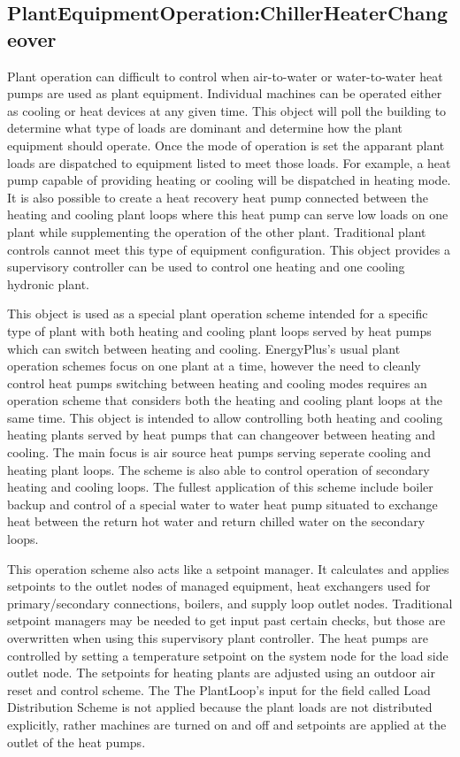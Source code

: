 \subsection{PlantEquipmentOperation:ChillerHeaterChangeover}\label{plantequipmentoperationchillerheaterchangeover}

Plant operation can difficult to control when air-to-water or water-to-water heat pumps are used as plant equipment.  Individual machines can be operated either as cooling or heat devices at any given time.  This object will poll the building to determine what type of loads are dominant and determine how the plant equipment should operate. Once the mode of operation is set the apparant plant loads are dispatched to equipment listed to meet those loads. For example, a heat pump capable of providing heating or cooling will be dispatched in heating mode. It is also possible to create a heat recovery heat pump connected between the heating and cooling plant loops where this heat pump can serve low loads on one plant while supplementing the operation of the other plant. Traditional plant controls cannot meet this type of equipment configuration. This object provides a supervisory controller can be used to control one heating and one cooling hydronic plant.

This object is used as a special plant operation scheme intended for a specific type of plant with both heating and cooling plant loops served by heat pumps which can switch between heating and cooling.  EnergyPlus's usual plant operation schemes focus on one plant at a time, however the need to cleanly control heat pumps switching between heating and cooling modes requires an operation scheme that considers both the heating and cooling plant loops at the same time.  This object is intended to allow controlling both heating and cooling heating plants served by heat pumps that can changeover between heating and cooling.  The main focus is air source heat pumps serving seperate cooling and heating plant loops.  The scheme is also able to control operation of secondary heating and cooling loops.  The fullest application of this scheme include boiler backup and control of a special water to water heat pump situated to exchange heat between the return hot water and return chilled water on the secondary loops.  

This operation scheme also acts like a setpoint manager.  It calculates and applies setpoints to the outlet nodes of managed equipment, heat exchangers used for primary/secondary connections, boilers, and supply loop outlet nodes.  Traditional setpoint managers may be needed to get input past certain checks, but those are overwritten when using this supervisory plant controller.  The heat pumps are controlled by setting a temperature setpoint on the system node for the load side outlet node.  The setpoints for heating plants are adjusted using an outdoor air reset and control scheme.  The The PlantLoop's input for the field called Load Distribution Scheme is not applied because the plant loads are not distributed explicitly, rather machines are turned on and off and setpoints are applied at the outlet of the heat pumps. 

